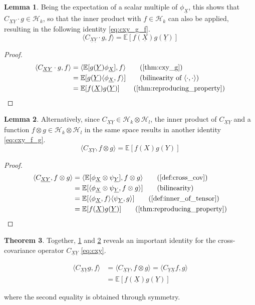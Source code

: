 \documentclass[twoside]{article} \usepackage{aistats2017}
\theoremstyle{definition}
\newtheorem{theorem}{Theorem}[section]
\newtheorem{lemma}[theorem]{Lemma}
\newcommand{\rv}[1]{\underline{#1}}
\newcommand{\expect}[1]{{\mathbb{E}[#1]}}
\newcommand{\inner}[2]{{\langle #1, #2 \rangle}}
\newcommand{\phiX}{\phi_{\rv{X}}}
\newcommand{\psiY}{\psi_{\rv{Y}}}
\newcommand{\Cxy}{C_{\rv{X} \rv{Y}}}
\newcommand{\Cyx}{C_{\rv{Y} \rv{X}}}
\begin{document}
	\begin{lemma} \label{thm:cxy_g_f}
		Being the expectation of a scalar multiple of $\phiX$, this shows that $\Cxy \cdot g \in \mathcal{H}_{k}$, so that the inner product with $f \in \mathcal{H}_{k}$ can also be applied, resulting in the following identity \eqref{eq:cxy_g_f}.
		\begin{equation}
			\inner{\Cxy \cdot g}{f} = \expect{f(\rv{X}) g(\rv{Y})}
		\label{eq:cxy_g_f}
		\end{equation}
		\begin{proof}
		\begin{align*}
			\inner{\Cxy \cdot g}{f} &= \inner{\expect{g(\rv{Y}) \phiX}}{f} \tag{\cref{thm:cxy_g}}\\
			&= \expect{g(\rv{Y}) \inner{\phiX}{f}} \tag{bilinearity of $\inner{\cdot}{\cdot}$} \\
			&= \expect{f(\rv{X}) g(\rv{Y})} \tag{\cref{thm:reproducing_property}}
		\end{align*}
		\end{proof}
	\end{lemma}
		

	\begin{lemma} \label{thm:cxy_f_g}
		Alternatively, since $\Cxy \in \mathcal{H}_{k} \otimes \mathcal{H}_{l}$, the inner product of $\Cxy$ and a function $f \otimes g \in \mathcal{H}_{k} \otimes \mathcal{H}_{l}$ in the same space results in another identity \eqref{eq:cxy_f_g}.
		\begin{equation}
			\inner{\Cxy}{f \otimes g} = \expect{f(X) g(Y)}
		\label{eq:cxy_f_g}
		\end{equation}
		
		\begin{proof}
		\begin{align*}
			\inner{\Cxy}{f \otimes g} &= \inner{\expect{\phiX \otimes \psiY}}{f \otimes g} \tag{\cref{def:cross_cov}} \\
			&= \expect{\inner{\phiX \otimes \psiY}{f \otimes g}} \tag{bilinearity} \\
			&= \expect{\inner{\phiX}{f} \inner{\psiY}{g}} \tag{\cref{def:inner_of_tensor}}\\
			&= \expect{f(\rv{X}) g(\rv{Y})} \tag{\cref{thm:reproducing_property}}
		\end{align*}
		\end{proof}			
	\end{lemma}
	
	\begin{theorem}
		Together, \cref{thm:cxy_g_f} and \cref{thm:cxy_f_g} reveals an important identity for the cross-covariance operator $\Cxy$ \eqref{eq:cxy}.
		
		\begin{equation}
		\begin{aligned}
			 \inner{\Cxy g}{f} &= \inner{\Cxy}{f \otimes g} = \inner{\Cyx f}{g} \\
			 &= \expect{f(\rv{X}) g(\rv{Y})}
			 \label{eq:cxy}			
		\end{aligned}
		\end{equation}
		
		where the second equality is obtained through symmetry. \\
	\end{theorem}
\end{document}
